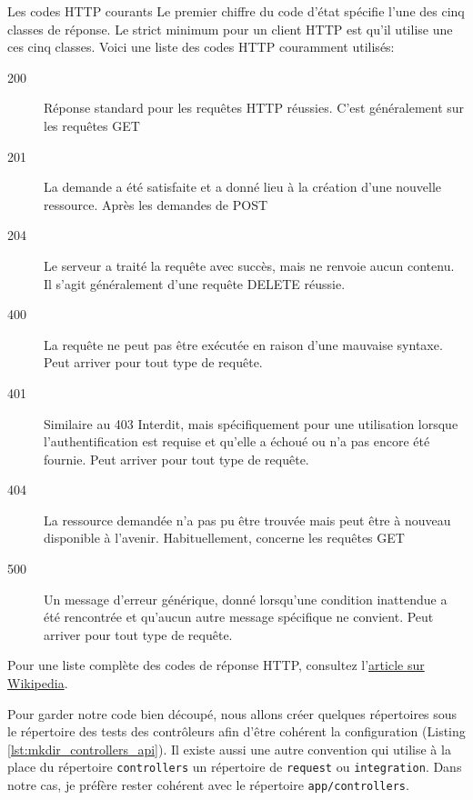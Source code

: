 \documentclass[]{report}
\begin{document}
    \begin{tcolorbox}{Les codes HTTP courants}\label{box:common_http_code}
      Le premier chiffre du code d'état spécifie l'une des cinq classes de réponse. Le strict minimum pour un client HTTP est qu'il utilise une ces cinq classes. Voici une liste des codes HTTP couramment utilisés:

      \begin{description}
        \item[200] Réponse standard pour les requêtes HTTP réussies. C'est généralement sur les requêtes GET
        \item[201] La demande a été satisfaite et a donné lieu à la création d'une nouvelle ressource. Après les demandes de POST
        \item[204] Le serveur a traité la requête avec succès, mais ne renvoie aucun contenu. Il s'agit généralement d'une requête DELETE réussie.
        \item[400] La requête ne peut pas être exécutée en raison d'une mauvaise syntaxe. Peut arriver pour tout type de requête.
        \item[401] Similaire au 403 Interdit, mais spécifiquement pour une utilisation lorsque l'authentification est requise et qu'elle a échoué ou n'a pas encore été fournie. Peut arriver pour tout type de requête.
        \item[404] La ressource demandée n'a pas pu être trouvée mais peut être à nouveau disponible à l'avenir. Habituellement, concerne les requêtes GET
        \item[500] Un message d'erreur générique, donné lorsqu'une condition inattendue a été rencontrée et qu'aucun autre message spécifique ne convient. Peut arriver pour tout type de requête.
      \end{description}

      Pour une liste complète des codes de réponse HTTP, consultez l'\href{https://fr.wikipedia.org/wiki/Liste_des_codes_HTTP}{article sur Wikipedia}.
    \end{tcolorbox}

    Pour garder notre code bien découpé, nous allons créer quelques répertoires sous le répertoire des tests des contrôleurs afin d'être cohérent la configuration (Listing \ref{lst:mkdir_controllers_api}). Il existe aussi une autre convention qui utilise à la place du répertoire \verb|controllers| un répertoire de \verb|request| ou \verb|integration|. Dans notre cas, je préfère rester cohérent avec le répertoire \verb|app/controllers|.
\end{document}
